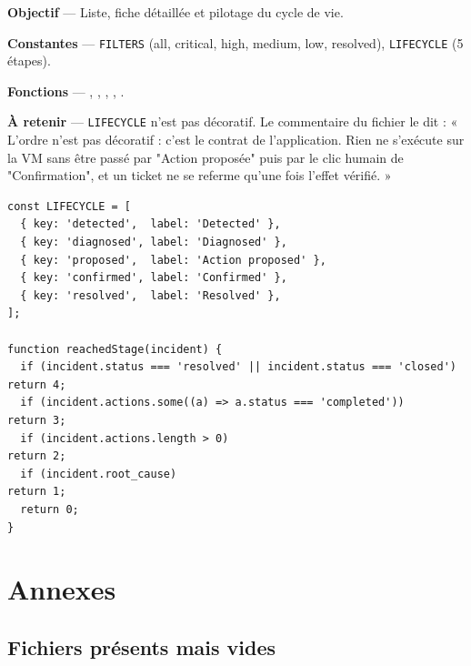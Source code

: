 \textbf{Objectif} --- Liste, fiche détaillée et pilotage du cycle de vie.

\textbf{Constantes} --- \texttt{FILTERS} (all, critical, high, medium, low,
resolved), \texttt{LIFECYCLE} (5 étapes).

\textbf{Fonctions} --- , , ,
, .

\textbf{À retenir} --- \texttt{LIFECYCLE} n'est pas décoratif. Le commentaire du
fichier le dit : « L'ordre n'est pas décoratif : c'est le contrat de
l'application. Rien ne s'exécute sur la VM sans être passé par "Action proposée"
puis par le clic humain de "Confirmation", et un ticket ne se referme qu'une
fois l'effet vérifié. »

\begin{lstlisting}[caption={Les cinq temps affichés, et la fonction qui calcule l'étape atteinte}]
const LIFECYCLE = [
  { key: 'detected',  label: 'Detected' },
  { key: 'diagnosed', label: 'Diagnosed' },
  { key: 'proposed',  label: 'Action proposed' },
  { key: 'confirmed', label: 'Confirmed' },
  { key: 'resolved',  label: 'Resolved' },
];

function reachedStage(incident) {
  if (incident.status === 'resolved' || incident.status === 'closed') return 4;
  if (incident.actions.some((a) => a.status === 'completed'))          return 3;
  if (incident.actions.length > 0)                                     return 2;
  if (incident.root_cause)                                             return 1;
  return 0;
}
\end{lstlisting}

\chapter{Annexes}

\section{Fichiers présents mais vides}

